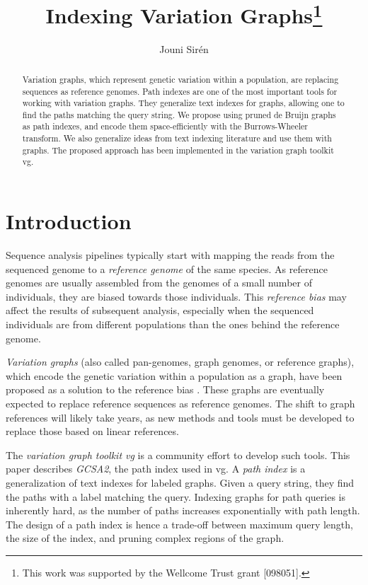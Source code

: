 \documentclass[a4paper,UKenglish]{lipics-v2016}
\title{Indexing Variation Graphs\footnote{This work was supported by the Wellcome Trust grant [098051].}}
\author[1]{Jouni Sirén}
\affil[1]{Wellcome Trust Sanger Institute, Hinxton, Cambridge, UK\\
  \texttt{jouni.siren@iki.fi}}
\begin{document}
\maketitle

\begin{abstract}
Variation graphs, which represent genetic variation within a population, are replacing sequences as reference genomes. Path indexes are one of the most important tools for working with variation graphs. They generalize text indexes for graphs, allowing one to find the paths matching the query string. We propose using pruned de Bruijn graphs as path indexes, and encode them space-efficiently with the Burrows-Wheeler transform. We also generalize ideas from text indexing literature and use them with graphs. The proposed approach has been implemented in the variation graph toolkit vg.
\end{abstract}


\section{Introduction}

Sequence analysis pipelines typically start with mapping the reads from the sequenced genome to a \emph{reference genome} of the same species. As reference genomes are usually assembled from the genomes of a small number of individuals, they are biased towards those individuals. This \emph{reference bias} may affect the results of subsequent analysis, especially when the sequenced individuals are from different populations than the ones behind the reference genome.

\emph{Variation graphs} (also called pan-genomes, graph genomes, or reference graphs), which encode the genetic variation within a population as a graph, have been proposed as a solution to the reference bias \cite{Paten2014,Marcus2014,Church2015,Dilthey2015,Marschall2016}. These graphs are eventually expected to replace reference sequences as reference genomes. The shift to graph references will likely take years, as new methods and tools must be developed to replace those based on linear references.

The \emph{variation graph toolkit vg} \cite{Garrison2014-2016} is a community effort to develop such tools. This paper describes \emph{GCSA2}, the path index used in vg. A \emph{path index} is a generalization of text indexes for labeled graphs. Given a query string, they find the paths with a label matching the query. Indexing graphs for path queries is inherently hard, as the number of paths increases exponentially with path length. The design of a path index is hence a trade-off between maximum query length, the size of the index, and pruning complex regions of the graph.
\end{document}
